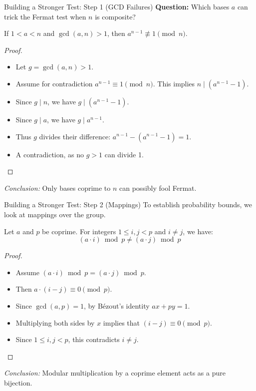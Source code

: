 \documentclass[10pt, compress]{beamer}
\begin{document}
\begin{frame}{Building a Stronger Test: Step 1 (GCD Failures)}
    \textbf{Question:} Which bases $a$ can trick the Fermat test when $n$ is composite?
    
    \pause
    \begin{lemma}
    If $1 < a < n$ and $\gcd(a, n) > 1$, then $a^{n-1} \not\equiv 1 \pmod{n}$.
    \end{lemma}
    
    \pause
    \begin{proof}
        \begin{itemize}[<+->]
            \item Let $g = \gcd(a, n) > 1$.
            \item Assume for contradiction $a^{n-1} \equiv 1 \pmod{n}$. This implies $n \mid (a^{n-1} - 1)$.
            \item Since $g \mid n$, we have $g \mid (a^{n-1} - 1)$.
            \item Since $g \mid a$, we have $g \mid a^{n-1}$.
            \item Thus $g$ divides their difference: $a^{n-1} - (a^{n-1} - 1) = 1$.
            \item A contradiction, as no $g > 1$ can divide 1.
        \end{itemize}
    \end{proof}
    
    \textit{Conclusion:} Only bases coprime to $n$ can possibly fool Fermat.
\end{frame}
\begin{frame}{Building a Stronger Test: Step 2 (Mappings)}
    To establish probability bounds, we look at mappings over the group.
    
    \pause
    \begin{lemma}
    Let $a$ and $p$ be coprime. For integers $1 \le i, j < p$ and $i \ne j$, we have:
    \[ (a \cdot i) \bmod p \ne (a \cdot j) \bmod p \]
    \end{lemma}
    
    \pause
    \begin{proof}
        \begin{itemize}[<+->]
            \item Assume $(a \cdot i) \bmod p = (a \cdot j) \bmod p$.
            \item Then $a \cdot (i - j) \equiv 0 \pmod p$.
            \item Since $\gcd(a, p) = 1$, by B\'{e}zout's identity $ax + py = 1$.
            \item Multiplying both sides by $x$ implies that $(i - j) \equiv 0 \pmod p$.
            \item Since $1 \le i, j < p$, this contradicts $i \ne j$.
        \end{itemize}
    \end{proof}
    
    \textit{Conclusion:} Modular multiplication by a coprime element acts as a pure bijection.
\end{frame}
\end{document}
